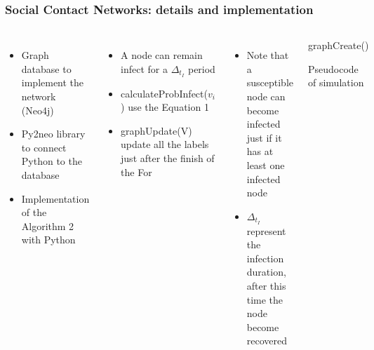 \documentclass{beamer}
\begin{document}
\begin{frame}[shrink=28]
\frametitle{Social Contact Networks: details and implementation}
\begin{columns}[c] %


\begin{itemize}
\item Graph database to implement the network (Neo4j)
\item Py2neo library to connect Python to the database 
\item Implementation of the Algorithm 2 with Python	
\end{itemize}
\vspace{10pt}
\begin{itemize}
\item A node can remain infect for a $\Delta_{t_I}$ period
\item calculateProbInfect($v_i$) use the Equation 1
\item graphUpdate(V) update all the labels just after the finish of the For
\end{itemize}
\vspace{10pt}

\begin{itemize}
\item Note that a susceptible node can become infected just if it has at least one infected node
\item $\Delta_{t_I}$ represent the infection duration, after this time the node become recovered

\end{itemize}


\begin{algorithm}[H]\label{alg:alg2}
 graphCreate()\;
\caption{Pseudocode of simulation}
\end{algorithm}

\end{columns}

\end{frame}
\end{document}
